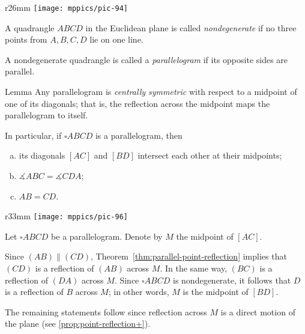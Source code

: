 {

\begin{wrapfigure}{r}{26mm}
\vskip-10mm
\centering
\texttt{[image: mppics/pic-94]}
\end{wrapfigure}

A quadrangle $ABCD$ in the Euclidean plane is called \emph{nondegenerate} if no three points from $A,B,C,D$ lie on one line.

}

A nondegenerate quadrangle  is called a \emph{parallelogram}
if its opposite sides are parallel.



\begin{thm}{Lemma}\label{lem:parallelogram}
Any parallelogram is \emph{centrally symmetric} with respect to a midpoint of one of its diagonals;
that is, the reflection across the midpoint maps the parallelogram to itself.

In particular, if $\square A B C D$ is a parallelogram, then
\begin{enumerate}[(a)]
\item\label{lem:parallelogram:midpoint} its diagonals $[AC]$ and $[BD]$ intersect each other at their midpoints;
\item $\measuredangle A B C= \measuredangle C D A$;
\item $AB=CD$.
\end{enumerate}
\end{thm}

{

\begin{wrapfigure}{r}{33mm}
\centering
\texttt{[image: mppics/pic-96]}
\end{wrapfigure}

 Let $\square A B C D$ be a parallelogram.
Denote by $M$ the midpoint of $[AC]$.

Since $(AB)\parallel (CD)$, Theorem~\ref{thm:parallel-point-reflection} implies that $(CD)$ is a reflection of $(AB)$ across $M$.
In the same way, $(BC)$ is a reflection of $(DA)$ across $M$.
Since $\square A B C D$ is nondegenerate, it follows that $D$ is a reflection of $B$ across $M$; in other words, $M$ is the midpoint of $[BD]$.

The remaining statements follow since reflection across $M$ is a direct motion of the plane (see \ref{prop:point-reflection+}).
\qeds

}

